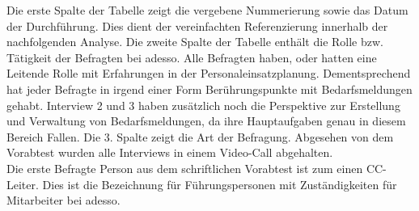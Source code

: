 Die erste Spalte der Tabelle zeigt die vergebene Nummerierung sowie das Datum der Durchführung. Dies dient der vereinfachten Referenzierung innerhalb der nachfolgenden Analyse. Die zweite Spalte der Tabelle enthält die Rolle bzw. Tätigkeit der Befragten bei adesso. Alle Befragten haben, oder hatten eine Leitende Rolle mit Erfahrungen in der Personaleinsatzplanung. Dementsprechend hat jeder Befragte in irgend einer Form Berührungspunkte mit Bedarfsmeldungen gehabt. Interview 2 und 3 haben zusätzlich noch die Perspektive zur Erstellung und Verwaltung von Bedarfsmeldungen, da ihre Hauptaufgaben genau in diesem Bereich Fallen. Die 3. Spalte zeigt die Art der Befragung. Abgesehen von dem Vorabtest wurden alle Interviews in einem Video-Call abgehalten.\\

Die erste Befragte Person aus dem schriftlichen Vorabtest ist zum einen CC-Leiter. Dies ist die Bezeichnung für Führungspersonen mit Zuständigkeiten für Mitarbeiter bei adesso.








